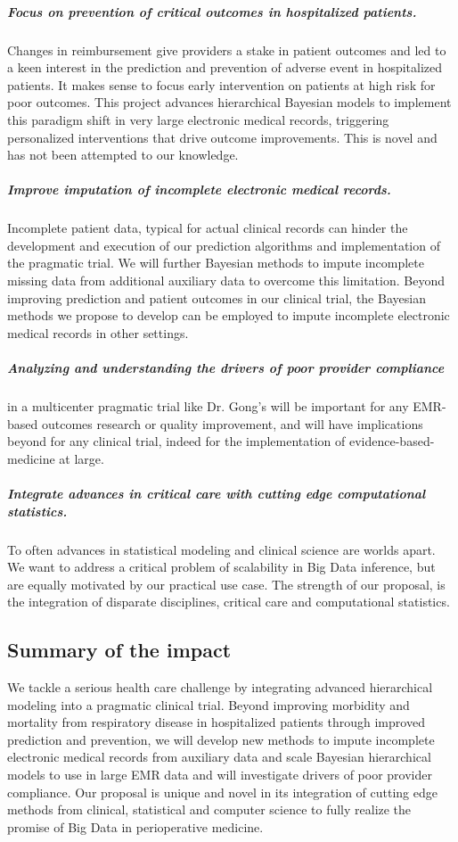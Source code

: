 \documentclass[11pt,notitlepage]{article}
\begin{document}
\subparagraph*{Focus on prevention of critical outcomes in hospitalized patients.}
Changes in reimbursement give providers a stake in patient outcomes and led to a keen interest in the prediction and prevention of adverse event in hospitalized patients. It makes sense to focus early intervention on patients at high risk for poor outcomes. This project advances hierarchical Bayesian models to implement this paradigm shift in very large electronic medical records, triggering personalized interventions that drive outcome improvements. This is novel and has not been attempted to our knowledge.

\subparagraph*{Improve imputation of incomplete electronic medical records.}
Incomplete patient data, typical for actual clinical records can hinder the development and execution of our prediction algorithms and implementation of the pragmatic trial. We will further Bayesian methods to impute incomplete missing data from additional auxiliary data to overcome this limitation. Beyond improving prediction and patient outcomes in our clinical trial, the Bayesian methods we propose to develop can be employed to impute incomplete electronic medical records in other settings.

\subparagraph{Analyzing and understanding the drivers of poor provider compliance} in a multicenter pragmatic trial like Dr. Gong's will be important for any EMR-based outcomes research or quality improvement, and will have implications beyond for any clinical trial, indeed for the implementation of evidence-based-medicine at large.

\subparagraph*{Integrate advances in critical care with cutting edge computational statistics.}
To often advances in statistical modeling and clinical science are worlds apart. We want to address a critical problem of scalability in Big Data inference, but are equally motivated by our practical use case. The strength of our proposal, is the integration of disparate disciplines, critical care and computational statistics. 

\subsection*{Summary of the impact}
We tackle a serious health care challenge by integrating advanced hierarchical modeling into a pragmatic clinical trial. Beyond improving morbidity and mortality from respiratory disease in hospitalized patients through improved prediction and prevention, we will develop new methods to impute incomplete electronic medical records from auxiliary data and scale Bayesian hierarchical models to use in large EMR data and will investigate drivers of poor provider compliance. Our proposal is unique and novel in its integration of cutting edge methods from clinical, statistical and computer science to fully realize the promise of Big Data in perioperative medicine.
\end{document}
